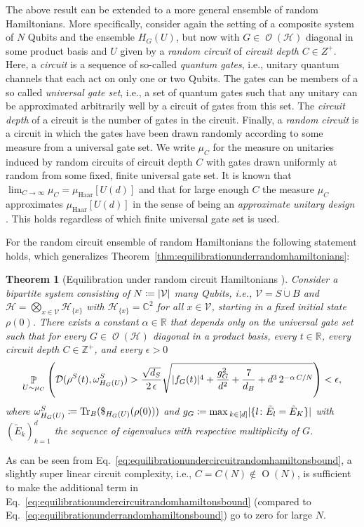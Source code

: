 \documentclass[a4paper,12pt,listof=totoc,index=totoc,bibliography=totoc,headsepline=false,headings=normal,BCOR16.153846mm,DIV12,headinclude,twoside,cleardoublepage=empty,numbers=noenddot,final]{scrreprt}
\theoremstyle{mystyle}
\numberwithin{equation}{section}
\numberwithin{figure}{section}
\numberwithin{lemma}{section}
\newtheorem{theorem}{Theorem}
\numberwithin{theorem}{section}
\numberwithin{corollary}{section}
\numberwithin{definition}{section}
\numberwithin{conjecture}{section}
\numberwithin{observation}{section}
\newcommand{\+}{\mkern2mu}
\newcommand{\coloneqq}{\mathrel{\vcentcolon\mkern-1.2mu=}} %
\newcommand{\dunion}{\mathbin{\dot{\cup}}}
\newcommand{\texteqref}[1]{Eq.~\eqref{#1}}
\newcommand{\oftype}{\colon}
\renewcommand{\max}{\mathchoice{\operatorname*{max}}{\operatorname*{max}}{\mathrm{max}}{\mathrm{max}}} %
\renewcommand{\H}{H}
\newcommand{\muhaar}{\mu_{\mathrm{Haar}}}
\newcommand{\muC}{\mu_C}
\newcommand{\Vset}{\mathcal{V}}
\newcommand{\tracedistance}[3][]{
  \ifthenelse{\equal{#2}{}}
  {\ifthenelse{\equal{#3}{}}
    {\mathcal{D}_{#1}}{}
  }{
    \ifthenelse{\equal{#1}{}}
    {\operatorname{\mathcal{D}}(#2,#3)}
    {\operatorname{\mathcal{D}}_{#1}(#2,#3)}
  }
}
\DeclareMathOperator{\landauO}{O}
\DeclareMathOperator*{\probability}{\mathbb{P}}
\DeclareMathOperator{\1}{\mathds{1}}
\DeclareMathOperator{\Obs}{\mathcal{O}}
\DeclareMathOperator{\Tr}{Tr}
\newcommand{\mc}[1]{\mathcal{#1}}
\newcommand{\mcH}{\mc{H}}
\newcommand{\mb}[1]{\mathbb{#1}}
\newcommand{\Z}{\mb{Z}}
\newcommand{\R}{\mb{R}}
\renewcommand{\C}{\mb{C}} %
\begin{document}
The above result can be extended to a more general ensemble of random Hamiltonians.
More specifically, consider again the setting of a composite system of $N$ Qubits and the ensemble $\H_G(U)$, but now with $G \in \Obs(\mcH)$ diagonal in some product basis and $U$ given by a \emph{random circuit} of \emph{circuit depth} $C \in Z^+$.
Here, a \emph{circuit} is a sequence of so-called \emph{quantum gates}, i.e., unitary quantum channels that each act on only one or two Qubits.
The gates can be members of a so called \emph{universal gate set}, i.e., a set of quantum gates such that any unitary can be approximated arbitrarily well by a circuit of gates from this set.
The \emph{circuit depth} of a circuit is the number of gates in the circuit.
Finally, a \emph{random circuit} is a circuit in which the gates have been drawn randomly according to some measure from a universal gate set.
We write $\muC$ for the measure on unitaries induced by random circuits of circuit depth $C$ with gates drawn uniformly at random from some fixed, finite universal gate set.
It is known that $\lim_{C\to\infty} \muC = \muhaar[U(d)]$  and that for large enough $C$ the measure $\muC$ approximates $\muhaar[U(d)]$ in the sense of being an \emph{approximate unitary design} \cite{Brandao2012}.
This holds regardless of which finite universal gate set is used.

For the random circuit ensemble of random Hamiltonians the following statement holds, which generalizes Theorem~\ref{thm:equilibrationunderrandomhamiltonians}:
\begin{theorem}[Equilibration under random circuit Hamiltonians {\cite[Result~3]{1108.0374}}] \label{thm:equilibrationundercircuitrandomhamiltonians}
   Consider a bipartite system consisting of $N \coloneqq |\Vset|$ many Qubits, i.e., $\Vset = S \dunion B$ and $\mcH = \bigotimes_{x\in\Vset} \mcH_{\{x\}}$ with $\mcH_{\{x\}} = \C^2$ for all $x \in \Vset$, starting in a fixed initial state $\rho(0)$.
  There exists a constant $\alpha \in \R$ that depends only on the universal gate set such that for every $G \in \Obs(\mcH)$ diagonal in a product basis, every $t \in \R$, every circuit depth $C \in \Z^+$, and every $\epsilon > 0$
  \begin{equation} \label{eq:equilibrationundercircuitrandomhamiltonsbound}
    \probability_{U \sim \muC}\left( \tracedistance{\rho^S(t)}{\omega_{H_G(U)}^S} > \frac{\sqrt{d_S}}{2\,\epsilon} \sqrt{ |f_G(t)|^4 + \frac{g_G^2}{d^2} + \frac{7}{d_B} + d^3\, 2^{-\alpha\,C/N}}\right) < \epsilon ,
  \end{equation}
  where $\omega_{H_G(U)}^S \coloneqq \Tr_B(\$_{\H_G(U)}(\rho(0)))$ and $g_G \coloneqq \max_{k\in[d]} |\{l\oftype \tilde E_l = \tilde E_K \}|$ with $(\tilde E_k)_{k=1}^d$ the sequence of eigenvalues with respective multiplicity of $G$.
\end{theorem}
As can be seen from \texteqref{eq:equilibrationundercircuitrandomhamiltonsbound}, a slightly super linear circuit complexity, i.e., $C = C(N) \notin \landauO(N)$, is sufficient to make the additional term in \texteqref{eq:equilibrationundercircuitrandomhamiltonsbound} (compared to \texteqref{eq:equilibrationunderrandomhamiltonsbound}) go to zero for large $N$.
\end{document}
